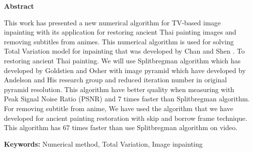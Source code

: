 \thispagestyle{empty}
\vspace{2 cm}
{\huge \bf Abstract}

\vspace{2 cm}
\hspace{1cm} This work has presented a new numerical algorithm for TV-based image inpainting with its application for restoring ancient Thai painting images and removing subtitles from animes. This numerical algorithm is used for solving Total Variation model for inpainting that was developed by Chan and Shen \cite{ref:rof-inpaint-chan-shen}. To restoring ancient Thai painting. We will use Splitbregman algorithm which has developed by Goldstien and Osher \cite{ref:splitbergman-inpaint} with image pyramid which have developed by Andelson and His research group \cite{ref:image-pyramid} and reduced iteration number in original pyramid resolution. This algorithm have better quality when measuring with Peak Signal Noise Ratio (PSNR) and 7 times faster than Splitbregman algorithm. For removing subtitle from anime, We have used the algorithm that we have developed for ancient  painting restoration with skip and borrow frame technique. This algorithm has 67 times faster than use Splitbregman algorithm on video.

\vspace{1 cm}

{\bf{Keywords:}} Numerical method, Total Variation, Image inpainting \\
\newpage